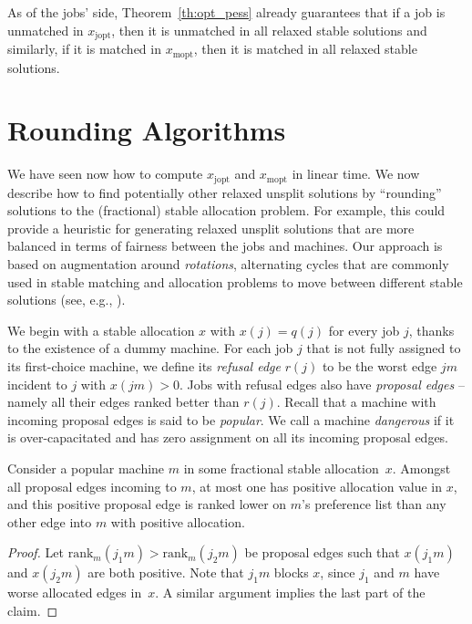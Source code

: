 \documentclass{llncs}
\begin{document}
As of the jobs' side, Theorem~\ref{th:opt_pess} already guarantees that if a job is unmatched in $x_{\text{jopt}}$, then it is unmatched in all relaxed stable solutions and similarly, if it is matched in $x_{\text{mopt}}$, then it is matched in all relaxed stable solutions.



\section{Rounding Algorithms}
\label{sec:rot}

We have seen now how to compute $x_{\text{jopt}}$ and
$x_{\text{mopt}}$ in linear time.  We now describe how to find
potentially other relaxed unsplit solutions by ``rounding'' solutions
to the (fractional) stable allocation problem.  For example, this
could provide a heuristic for generating relaxed unsplit solutions
that are more balanced in terms of fairness between the jobs and
machines.  Our approach is based on augmentation around
\emph{rotations}, alternating cycles that are commonly used in stable
matching and allocation problems to move between different stable
solutions (see, e.g., \cite{DBLP:journals/algorithmica/DeanM10,GusfieldI89}).

We begin with a stable allocation $x$ with $x(j) = q(j)$ for every job
$j$, thanks to the existence of a dummy machine.  For each job $j$
that is not fully assigned to its first-choice machine, we define its
\emph{refusal edge} $r(j)$ to be the worst edge $jm$ incident to $j$
with $x(jm) > 0$. Jobs with refusal edges also have \emph{proposal
  edges} -- namely all their edges ranked better than $r(j)$.  Recall
that a machine with incoming proposal edges is said to be
\emph{popular}.  We call a machine {\em dangerous} if it is
over-capacitated and has zero assignment on all its incoming proposal
edges.

\begin{claim}
\label{claim:structure_of_h}
Consider a popular machine $m$ in some fractional stable
allocation~$x$. Amongst all proposal edges incoming to $m$, at most
one has positive allocation value in $x$, and this positive proposal
edge is ranked lower on $m$'s preference list than any other edge
into $m$ with positive allocation.
\end{claim}

\begin{proof} Let $\text{rank}_m(j_1m) > \text{rank}_m(j_2m)$ be proposal 
edges such that $x(j_1m)$ and $x(j_2m)$ are both positive. Note that
$j_1m$ blocks $x$, since $j_1$ and $m$ have worse allocated edges
in~$x$. A similar argument implies the last part of the claim.
\end{proof}
\end{document}
